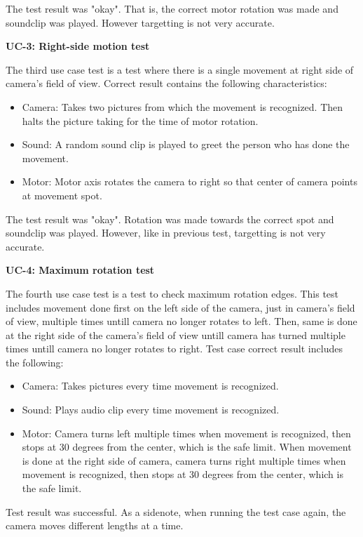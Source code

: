 \documentclass[english,11pt,twoside,a4paper]{article}
\begin{document}
The test result was "okay". That is, the correct motor rotation was made and soundclip was played. However targetting is not very accurate.

\textbf{UC-3: Right-side motion test}

The third use case test is a test where there is a single movement at right side of camera's field of view. Correct result contains the following characteristics:

\begin{itemize}
  \item Camera: Takes two pictures from which the movement is recognized. Then halts the picture taking for the time of motor rotation.
  \item Sound: A random sound clip is played to greet the person who has done the movement.
  \item Motor: Motor axis rotates the camera to right so that center of camera points at movement spot.
\end{itemize}

The test result was "okay". Rotation was made towards the correct spot and soundclip was played. However, like in previous test, targetting is not very accurate.

\textbf{UC-4: Maximum rotation test}

The fourth use case test is a test to check maximum rotation edges. This test includes movement done first on the left side of the camera, just in camera's field of view, multiple times untill camera no longer rotates to left. Then, same is done at the right side of the camera's field of view untill camera has turned multiple times untill camera no longer rotates to right. Test case correct result includes the following:

\begin{itemize}
  \item Camera: Takes pictures every time movement is recognized.
  \item Sound: Plays audio clip every time movement is recognized.
  \item Motor: Camera turns left multiple times when movement is recognized, then stops at 30 degrees from the center, which is the safe limit. When movement is done at the right side of camera, camera turns right multiple times when movement is recognized, then stops at 30 degrees from the center, which is the safe limit.
\end{itemize}

Test result was successful. As a sidenote, when running the test case again, the camera moves different lengths at a time.
\end{document}
